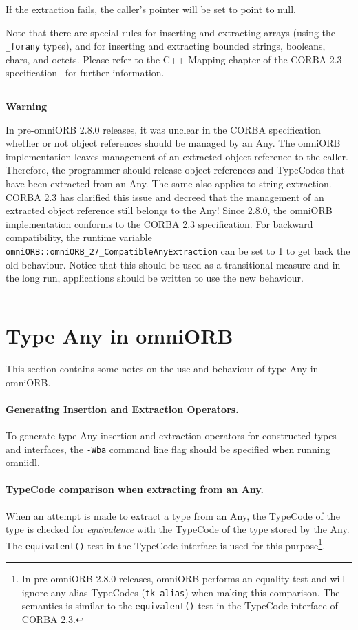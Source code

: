 \documentclass[11pt,twoside,a4paper]{book}
\newcommand{\type}[1]{\texttt{#1}}
\newcommand{\code}[1]{\texttt{#1}}
\newcommand{\op}[1]{\texttt{#1()}}
\newenvironment{statement}%
 {\noindent\begin{minipage}{\textwidth}%
  \vspace{.5\baselineskip}%
  \noindent\rule{\textwidth}{2pt}%
  \vspace{.25\baselineskip}%
  \begin{list}{}{\setlength{\listparindent}{0em}%
                 \setlength{\itemindent}{0em}%
                 \setlength{\leftmargin}{1.5em}%
                 \setlength{\rightmargin}{\leftmargin}%
                 \setlength{\topsep}{0pt}%
                 \setlength{\partopsep}{0pt}}
  \item\relax}
 {\end{list}%
  \vspace{-.25\baselineskip}%
  \noindent\rule{\textwidth}{2pt}%
  \vspace{.5\baselineskip}%
  \end{minipage}}
\begin{document}
If the extraction fails, the caller's pointer will be set to point to
null.

Note that there are special rules for inserting and extracting arrays
(using the \type{\_forany} types), and for inserting and extracting
bounded strings, booleans, chars, and octets. Please refer to the C++
Mapping chapter of the CORBA 2.3 specification~\cite{corba23-spec} for
further information.


\begin{statement}
\centerline{\textbf{Warning}}

In pre-omniORB 2.8.0 releases, it was unclear in the CORBA
specification whether or not object references should be managed by an
Any.  The omniORB implementation leaves management of an extracted
object reference to the caller. Therefore, the programmer should
release object references and TypeCodes that have been extracted from
an Any. The same also applies to string extraction. CORBA 2.3 has
clarified this issue and decreed that the management of an extracted
object reference still belongs to the Any!  Since 2.8.0, the omniORB
implementation conforms to the CORBA 2.3 specification. For backward
compatibility, the runtime variable
\code{omniORB::omniORB\_27\_CompatibleAnyExtraction} can be set to 1
to get back the old behaviour. Notice that this should be used as a
transitional measure and in the long run, applications should be
written to use the new behaviour.

\end{statement}


\section{Type Any in omniORB}
\label{anyOmniORB}

This section contains some notes on the use and behaviour of type Any
in omniORB.

\paragraph*{Generating Insertion and Extraction Operators.}
To generate type Any insertion and extraction operators for
constructed types and interfaces, the \texttt{-Wba} command line flag
should be specified when running omniidl.

\paragraph*{TypeCode comparison when extracting from an Any.}
When an attempt is made to extract a type from an Any, the TypeCode of
the type is checked for \emph{equivalence} with the TypeCode of the
type stored by the Any. The \op{equivalent} test in the TypeCode
interface is used for this purpose\footnote{In pre-omniORB 2.8.0
releases, omniORB performs an equality test and will ignore any alias
TypeCodes (\code{tk\_alias}) when making this comparison. The
semantics is similar to the \op{equivalent} test in the TypeCode
interface of CORBA 2.3.}.
\end{document}
